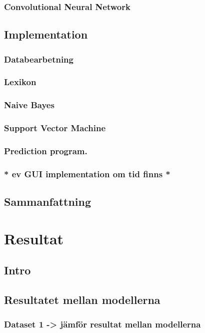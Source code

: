 \documentclass{kaumasters} %
\begin{document}
\subsection{Convolutional Neural Network}




\section{Implementation}\label{impl}
\subsection{Databearbetning}\label{impl:pre}


\subsection{Lexikon}\label{impl:lex}
\subsection{Naive Bayes}\label{impl:nb}
\subsection{Support Vector Machine}\label{impl:svm}
\subsection{Prediction program.}
\subsection{* ev GUI implementation om tid finns *}
\section{Sammanfattning}

\chapter{Resultat} \label{res}
\section{Intro}
\section{Resultatet mellan modellerna}
\subsection{Dataset 1 -> jämför resultat mellan modellerna}
\end{document}
